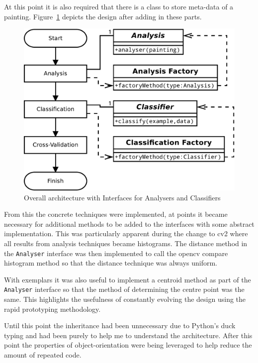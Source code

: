 At this point it is also required that there is a class to store meta-data of a painting. 
Figure~\ref{fig:interfaces-arch} depicts the design after adding in these parts.

\begin{figure}[h]
\centering
\includegraphics[width=\linewidth]{img/interfaces-arch}
\caption{Overall architecture with Interfaces for Analysers and Classifiers}\label{fig:interfaces-arch}
\end{figure}

From this the concrete techniques were implemented, at points it became necessary for additional 
methods to be added to the interfaces with some abstract implementation. This was particularly
apparent during the change to \gls{cv2} where all results from analysis techniques became 
histograms. The distance method in the \texttt{Analyser} interface was then implemented to call
the \gls{opencv} compare histogram method so that the distance technique was always uniform.

With exemplars it was also useful to implement a centroid method as part of the \texttt{Analyser}
interface so that the method of determining the centre point was the same. This highlights the 
usefulness of constantly evolving the design using the rapid prototyping methodology.

Until this point the inheritance had been unnecessary due to Python's duck typing and had been
purely to help me to understand the architecture. After this point the properties of 
object-orientation were being leveraged to help reduce the amount of repeated code.

